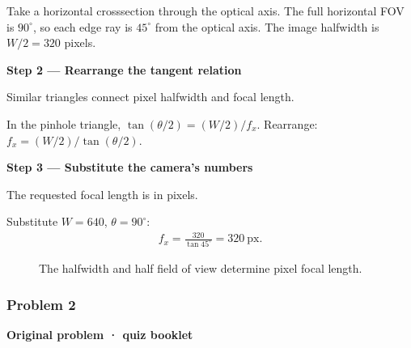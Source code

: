 \documentclass[letterpaper,11pt,english,openany,oneside]{jupyterBook}
\begin{document}
\sphinxAtStartPar
Take a horizontal cross\sphinxhyphen{}section through the optical axis. The full horizontal FOV is {\color{QuizMathBlue} \(90^\circ\)}, so each edge ray is {\color{QuizMathBlue} \(45^\circ\)} from the optical axis. The image half\sphinxhyphen{}width is {\color{QuizMathBlue} \(W/2=320\)} pixels.

\par

\par\medskip{}
{\color{QuizStepRed}\bfseries Step 2 — Rearrange the tangent relation}\par\smallskip

\sphinxAtStartPar
{} Similar triangles connect pixel half\sphinxhyphen{}width and focal length.

\sphinxAtStartPar
In the pinhole triangle, {\color{QuizMathBlue} \(\tan(\theta/2)=(W/2)/f_x\)}. Rearrange: {\color{QuizMathBlue} \(f_x=(W/2)/\tan(\theta/2)\)}.

\par

\par\medskip{}
{\color{QuizStepRed}\bfseries Step 3 — Substitute the camera's numbers}\par\smallskip

\sphinxAtStartPar
{} The requested focal length is in pixels.

\sphinxAtStartPar
Substitute {\color{QuizMathBlue} \(W=640\)}, {\color{QuizMathBlue} \(\theta=90^\circ\)}:
{\color{QuizMathBlue} \begin{equation*}
\begin{split}
\boxed{f_x=\frac{320}{\tan45^\circ}=320\ \mathrm{px}}.
\end{split}
\end{equation*}}
\par

\begin{figure}[H]
\centering
\capstart

\noindent{}
\caption{The half\sphinxhyphen{}width and half field of view determine pixel focal length.}\label{\detokenize{lectures/lecture03/quiz-workbook:id8}}\end{figure}


\subsubsection{Problem 2}
\label{\detokenize{lectures/lecture03/quiz-workbook:problem-2}}\label{\detokenize{lectures/lecture03/quiz-workbook:quiz-10-q2}}
\par\medskip\textbf{Original problem · quiz booklet}\par\smallskip
\end{document}
